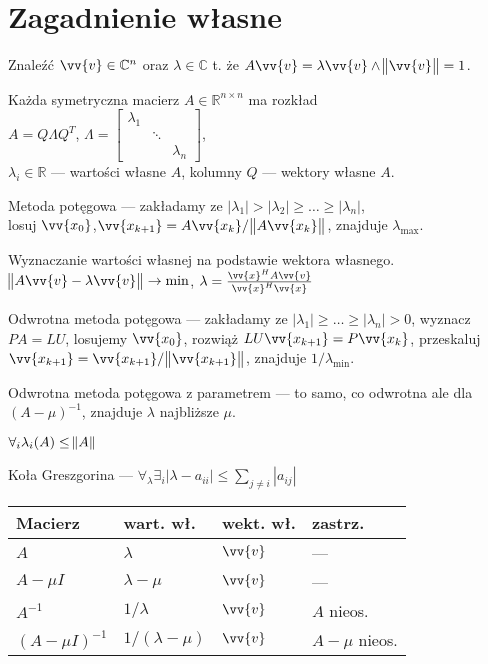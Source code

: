 \section{Zagadnienie własne}
\entry
Znaleźć $\vv{v} \in \mathbb{C}^n$ oraz $\lambda \in \mathbb{C}$ t. że
$A\vv{v} = \lambda\vv{v} \land \norm{\vv{v}} = 1$.

\entry
Każda symetryczna macierz $A\in\mathbb{R}^{n\times n}$ ma rozkład\\
$A = Q \Lambda Q^T$, $\Lambda =
\begin{bmatrix}
  \lambda_1\\
  & \ddots \\
  && \lambda_n
\end{bmatrix}$,\\
$\lambda_i \in \mathbb{R}$ --- wartości własne $A$, kolumny $Q$ --- wektory własne $A$.

\entry
Metoda potęgowa --- zakładamy  ze $|\lambda_1| > |\lambda_2| \ge \hdots \ge |\lambda_n|$,\\
losuj $\vv{x_0}$,\quad $\vv{x_{k+1}} = A\vv{x_k} / \norm{A \vv{x_k}}$,
znajduje $\lambda_{\text{max}}$.

\entry
Wyznaczanie wartości własnej na podstawie wektora własnego.
$\norm{A\vv{v} - \lambda\vv{v}} \rightarrow \min$,
$\lambda = \frac{\vv{x}^H A\vv{v}}{\vv{x}^H\vv{x}}$

\entry
Odwrotna metoda potęgowa --- zakładamy  ze $|\lambda_1| \ge \hdots \ge |\lambda_n| > 0$,
wyznacz $PA = LU$, losujemy $\vv{x_0}$,
rozwiąż $LU\vv{x_{k+1}} = P\vv{x_k}$, przeskaluj $\vv{x_{k+1}} = \vv{x_{k+1}}/\norm{\vv{x_{k+1}}}$,
znajduje $1 / \lambda_{\text{min}}$.

\entry
Odwrotna metoda potęgowa z parametrem --- to samo, co odwrotna ale dla $(A - \mu)^{-1}$,
znajduje $\lambda$ najbliższe $\mu$.

\entry
$\forall_{i} \lambda_i(A) \le \norm{A}$

\entry
Koła Greszgorina --- $\forall_{\lambda} \exists_{i} |\lambda - a_{ii}| \le \sum_{j\neq i}|a_{ij}|$

\entry
\begin{tabular}{|
    >{\centering}p{2cm}|
    >{\centering}p{2cm}|
    >{\centering}p{1.5cm}|
    >{\centering\arraybackslash}p{2cm}
  |}
  \hline
  Macierz & wart. wł. & wekt. wł. & zastrz.\\
  \hline
  $A$ & $\lambda$ & $\vv{v}$ & --- \\
  \hline
  $A - \mu I$ & $\lambda - \mu$ & $\vv{v}$ & --- \\
  \hline
  $A^{-1}$ & $1/\lambda$ & $\vv{v}$ & $A$ nieos. \\
  \hline
  $(A - \mu I)^{-1}$ & $1/(\lambda - \mu)$ & $\vv{v}$ & $A-\mu$ nieos. \\
  \hline
\end{tabular}
